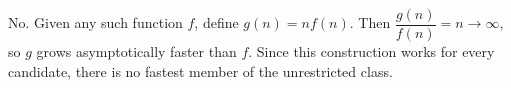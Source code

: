 No. Given any such function $f$, define $g(n)=nf(n)$. Then $\dfrac{g(n)}{f(n)}=n\to\infty$, so $g$ grows asymptotically faster than $f$. Since this construction works for every candidate, there is no fastest member of the unrestricted class.
